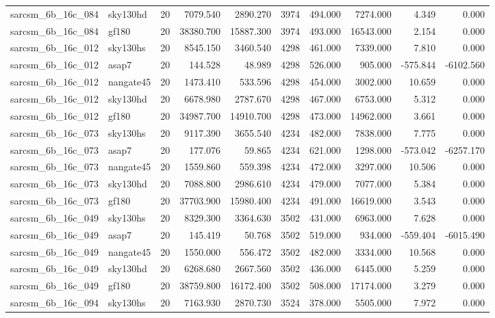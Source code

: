 \begin{tabular}{llrrrrrrrr}
sarcsm\_6b\_16c\_084 & sky130hd & 20 & 7079.540 & 2890.270 & 3974 & 494.000 & 7274.000 & 4.349 & 0.000 \\
sarcsm\_6b\_16c\_084 & gf180 & 20 & 38380.700 & 15887.300 & 3974 & 493.000 & 16543.000 & 2.154 & 0.000 \\
sarcsm\_6b\_16c\_012 & sky130hs & 20 & 8545.150 & 3460.540 & 4298 & 461.000 & 7339.000 & 7.810 & 0.000 \\
sarcsm\_6b\_16c\_012 & asap7 & 20 & 144.528 & 48.989 & 4298 & 526.000 & 905.000 & -575.844 & -6102.560 \\
sarcsm\_6b\_16c\_012 & nangate45 & 20 & 1473.410 & 533.596 & 4298 & 454.000 & 3002.000 & 10.659 & 0.000 \\
sarcsm\_6b\_16c\_012 & sky130hd & 20 & 6678.980 & 2787.670 & 4298 & 467.000 & 6753.000 & 5.312 & 0.000 \\
sarcsm\_6b\_16c\_012 & gf180 & 20 & 34987.700 & 14910.700 & 4298 & 473.000 & 14962.000 & 3.661 & 0.000 \\
sarcsm\_6b\_16c\_073 & sky130hs & 20 & 9117.390 & 3655.540 & 4234 & 482.000 & 7838.000 & 7.775 & 0.000 \\
sarcsm\_6b\_16c\_073 & asap7 & 20 & 177.076 & 59.865 & 4234 & 621.000 & 1298.000 & -573.042 & -6257.170 \\
sarcsm\_6b\_16c\_073 & nangate45 & 20 & 1559.860 & 559.398 & 4234 & 472.000 & 3297.000 & 10.506 & 0.000 \\
sarcsm\_6b\_16c\_073 & sky130hd & 20 & 7088.800 & 2986.610 & 4234 & 479.000 & 7077.000 & 5.384 & 0.000 \\
sarcsm\_6b\_16c\_073 & gf180 & 20 & 37703.900 & 15980.400 & 4234 & 491.000 & 16619.000 & 3.543 & 0.000 \\
sarcsm\_6b\_16c\_049 & sky130hs & 20 & 8329.300 & 3364.630 & 3502 & 431.000 & 6963.000 & 7.628 & 0.000 \\
sarcsm\_6b\_16c\_049 & asap7 & 20 & 145.419 & 50.768 & 3502 & 519.000 & 934.000 & -559.404 & -6015.490 \\
sarcsm\_6b\_16c\_049 & nangate45 & 20 & 1550.000 & 556.472 & 3502 & 482.000 & 3334.000 & 10.568 & 0.000 \\
sarcsm\_6b\_16c\_049 & sky130hd & 20 & 6268.680 & 2667.560 & 3502 & 436.000 & 6445.000 & 5.259 & 0.000 \\
sarcsm\_6b\_16c\_049 & gf180 & 20 & 38759.800 & 16172.400 & 3502 & 508.000 & 17174.000 & 3.279 & 0.000 \\
sarcsm\_6b\_16c\_094 & sky130hs & 20 & 7163.930 & 2870.730 & 3524 & 378.000 & 5505.000 & 7.972 & 0.000 \\

\end{tabular}
